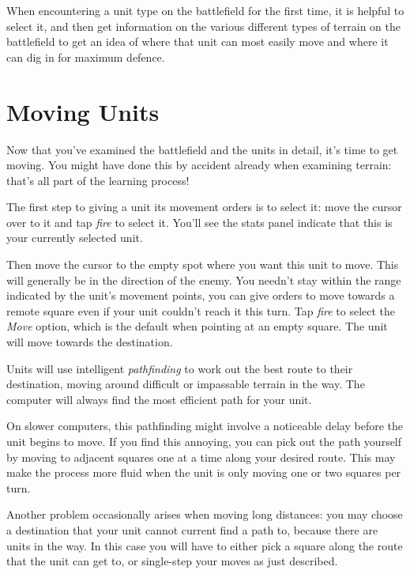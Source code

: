 When encountering a unit type on the battlefield for the first time, it is helpful to select it, and then get information on the various different types of terrain on the battlefield to get an idea of where that unit can most easily move and where it can dig in for maximum defence.

\section{Moving Units}

\noindent
Now that you've examined the battlefield and the units in detail, it's time to get moving. You might have done this by accident already when examining terrain: that's all part of the learning process!

The first step to giving a unit its movement orders is to select it: move the cursor over to it and tap {\it fire} to select it. You'll see the stats panel indicate that this is your currently selected unit.

Then move the cursor to the empty spot where you want this unit to move. This will generally be in the direction of the enemy. You needn't stay within the range indicated by the unit's movement points, you can give orders to move towards a remote square even if your unit couldn't reach it this turn. Tap {\it fire} to select the {\it Move} option, which is the default when pointing at an empty square. The unit will move towards the destination.

Units will use intelligent {\it pathfinding} to work out the best route to their destination, moving around difficult or impassable terrain in the way. The computer will always find the most efficient path for your unit.

On slower computers, this pathfinding might involve a noticeable delay before the unit begins to move. If you find this annoying, you can pick out the path yourself by moving to adjacent squares one at a time along your desired route. This may make the process more fluid when the unit is only moving one or two squares per turn.

Another problem occasionally arises when moving long distances: you may choose a destination that your unit cannot current find a path to, because there are units in the way. In this case you will have to either pick a square along the route that the unit can get to, or single-step your moves as just described.

